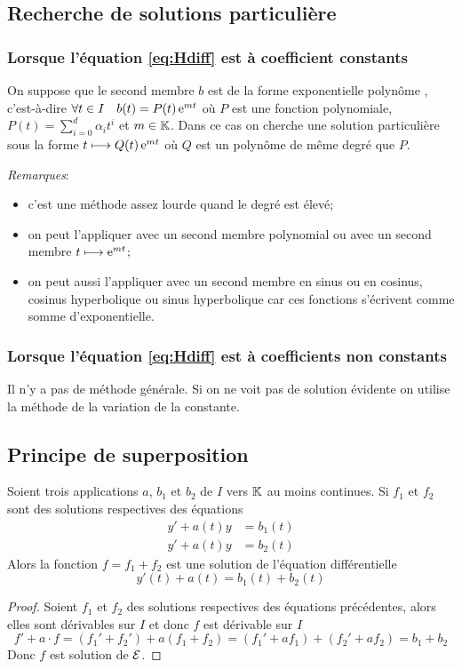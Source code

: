 \subsection{Recherche de solutions particulière}
\label{subsec:recherchesolutionpart}
\subsubsection{Lorsque l'équation \eqref{eq:Hdiff} est à coefficient constants}
\label{subsubsec:recherchesolutionpart-coefconstants}
On suppose que le second membre $b$ est de la forme \og exponentielle polynôme \fg{}, c'est-à-dire $\forall t \in I \quad b(t)=P(t) \operatorname{e}^{mt}$ où $P$ est une fonction polynomiale, $P(t)=\sum_{i=0}^d \alpha_i t^i$ et $m \in \mathbb{K}$. Dans ce cas on cherche une solution particulière sous la forme $t \longmapsto Q(t)\operatorname{e}^{mt}$ où $Q$ est un polynôme de même degré que $P$.

\emph{Remarques}:
\begin{itemize}
\item c'est une méthode assez lourde quand le degré est élevé;
\item on peut l'appliquer avec un second membre polynomial ou avec un second membre $t \longmapsto \operatorname{e}^{mt}$;
\item on peut aussi l'appliquer avec un second membre en sinus ou en cosinus, cosinus hyperbolique ou sinus hyperbolique car ces fonctions s'écrivent comme somme d'exponentielle.
\end{itemize}
\subsubsection{Lorsque l'équation \eqref{eq:Hdiff} est à coefficients non constants}
\label{subsubsec:recherchesolutionpart-coefnnconstants}
Il n'y a pas de méthode générale. Si on ne voit pas de solution \og évidente \fg{} on utilise la méthode de la variation de la constante.
%
\subsection{Principe de superposition}
\label{subsec:principesuperposition}
\begin{prop}
  Soient trois applications $a$, $b_1$ et $b_2$ de $I$ vers $\mathbb{K}$ au moins continues. Si $f_1$ et $f_2$ sont des solutions respectives des équations
  \begin{align}
    y'+a(t)y&=b_1(t)\\ y'+a(t)y&=b_2(t)
  \end{align}
Alors la fonction $f=f_1+f_2$ est une solution de l'équation différentielle 
\begin{equation}
  y'(t)+a(t)=b_1(t)+b_2(t)
\end{equation}
\end{prop}
\begin{proof}
  Soient $f_1$ et $f_2$ des solutions respectives des équations précédentes, alors elles sont dérivables sur $I$ et donc $f$ est dérivable sur $I$
  \begin{equation}
    f'+a \cdot f=(f_1' + f_2')+a(f_1+f_2)=(f_1'+af_1)+(f_2'+af_2)=b_1+b_2
  \end{equation}
Donc $f$ est solution de $\mathcal{E}$.
\end{proof}
%
